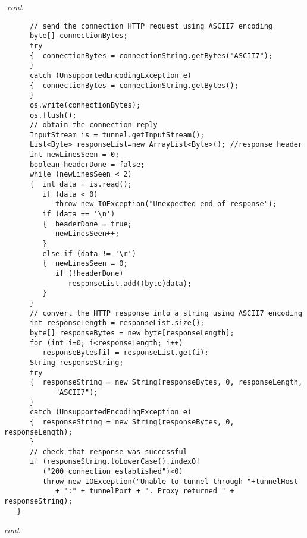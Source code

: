 \begin{figure*}\begin{program}\emph{-cont}\begin{verbatim}
      // send the connection HTTP request using ASCII7 encoding
      byte[] connectionBytes;
      try
      {  connectionBytes = connectionString.getBytes("ASCII7");
      }
      catch (UnsupportedEncodingException e)
      {  connectionBytes = connectionString.getBytes();
      }
      os.write(connectionBytes);
      os.flush();
      // obtain the connection reply
      InputStream is = tunnel.getInputStream();
      List<Byte> responseList=new ArrayList<Byte>(); //response header
      int newLinesSeen = 0;
      boolean headerDone = false;
      while (newLinesSeen < 2)
      {  int data = is.read();
         if (data < 0)
            throw new IOException("Unexpected end of response");
         if (data == '\n')
         {  headerDone = true;
            newLinesSeen++;
         }
         else if (data != '\r')
         {  newLinesSeen = 0;
            if (!headerDone)
               responseList.add((byte)data);
         }
      }
      // convert the HTTP response into a string using ASCII7 encoding
      int responseLength = responseList.size();
      byte[] responseBytes = new byte[responseLength];
      for (int i=0; i<responseLength; i++)
         responseBytes[i] = responseList.get(i);
      String responseString;
      try
      {  responseString = new String(responseBytes, 0, responseLength,
            "ASCII7");
      }
      catch (UnsupportedEncodingException e)
      {  responseString = new String(responseBytes, 0, responseLength);
      }
      // check that response was successful
      if (responseString.toLowerCase().indexOf
         ("200 connection established")<0)
         throw new IOException("Unable to tunnel through "+tunnelHost
            + ":" + tunnelPort + ". Proxy returned " + responseString);
   }
\end{verbatim}\hfill \emph{cont-}\end{program}\end{figure*}%

